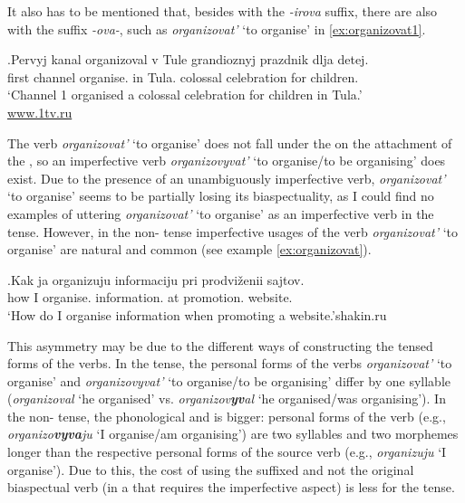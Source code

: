 It also has to be mentioned that, besides  with the \mbox{\textit{-irova}} suffix, there are also  with the suffix \textit{-ova-}, such as \textit{organizovat'} `to organise' in \ref{ex:organizovat1}. 

\exg.\label{ex:organizovat1}Pervyj kanal organizoval\textsuperscript{\PF} v Tule grandioznyj prazdnik dlja detej.\\
first channel organise. in Tula. colossal celebration for children.\\
\trans `Channel 1 organised a colossal celebration for children in Tula.'\\\hbox{}\hfill\hbox{\url{www.1tv.ru}}

The verb \textit{organizovat'} `to organise' does not fall under the  on the attachment of the , so an imperfective verb \textit{organizovyvat'}\textsuperscript{\IPF} `to organise/to be organising' does exist. Due to the presence of an unambiguously imperfective verb, \textit{organizovat'} `to organise' seems to be partially losing its biaspectuality, as I could find no examples of uttering \textit{organizovat'} `to organise' as an imperfective verb in the  tense. However, in the non- tense imperfective usages of the verb \textit{organizovat'} `to organise' are natural and common (see example \ref{ex:organizovat}).

\exg.\label{ex:organizovat}Kak ja organizuju\textsuperscript{\IPF} informaciju pri prodvi\v{z}enii sajtov.\\
how I organise. information. at promotion. website.\\
\trans `How do I organise information when promoting a website.'\hbox{}\hfill\hbox{shakin.ru}

This asymmetry may be due to the different ways of constructing the tensed forms of the verbs. In the  tense, the personal forms of the verbs \textit{organizovat'} `to organise' and \textit{organizovyvat'}\textsuperscript{\IPF} `to organise/to be organising' differ by one syllable (\textit{organizoval} `he organised' vs. \textit{organizov\textbf{yv}al} `he organised/was organising'). In the non- tense, the phonological and  is bigger: personal forms of the  verb (e.g., \textit{organizo\textbf{vyva}ju} `I organise/am organising') are two syllables and two morphemes longer than the respective personal forms of the source verb (e.g., \textit{organizuju} `I organise'). Due to this, the cost of using the suffixed and not the original biaspectual verb (in a  that requires the imperfective aspect) is less for the  tense.

